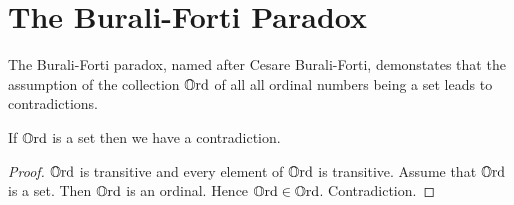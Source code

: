 \documentclass{article}
\begin{document}
  \section*{The Burali-Forti Paradox}

  The Burali-Forti paradox, named after Cesare Burali-Forti, demonstates that
  the assumption of the collection $\mathbb{O}\mathrm{rd}$ of all all ordinal numbers being a set
  leads to contradictions.

  \begin{forthel}
    \begin{theorem}
      If $\mathbb{O}\mathrm{rd}$ is a set then we have a contradiction.
    \end{theorem}
    \begin{proof}
      $\mathbb{O}\mathrm{rd}$ is transitive and every element of $\mathbb{O}\mathrm{rd}$ is transitive.
      Assume that $\mathbb{O}\mathrm{rd}$ is a set.
      Then $\mathbb{O}\mathrm{rd}$ is an ordinal.
      Hence $\mathbb{O}\mathrm{rd} \in \mathbb{O}\mathrm{rd}$.
      Contradiction.
    \end{proof}
  \end{forthel}
\end{document}
